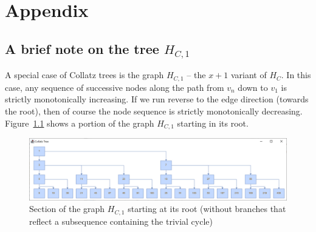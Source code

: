 \appendix
\chapter{Appendix}

\section{\texorpdfstring{A brief note on the tree $H_{C,1}$}{A brief note on the tree HC1}}
\label{appx:x_plus_1_variant}
A special case of Collatz trees is the graph $H_{C,1}$ -- the $x+1$ variant of $H_C$. In this case, any sequence of successive nodes along the path from $v_n$ down to $v_1$ is strictly monotonically increasing. If we run reverse to the edge direction (towards the root), then of course the node sequence is strictly monotonically decreasing. Figure~\ref{fig:hc1} shows a portion of the graph $H_{C,1}$ starting in its root.

\begin{figure}[H]
	\includegraphics[width=1.00\textwidth]{figures/h_c1.png}
	\caption{Section of the graph $H_{C,1}$ starting at its root (without branches that reflect a subsequence containing the trivial cycle)}
	\label{fig:hc1}
\end{figure}


